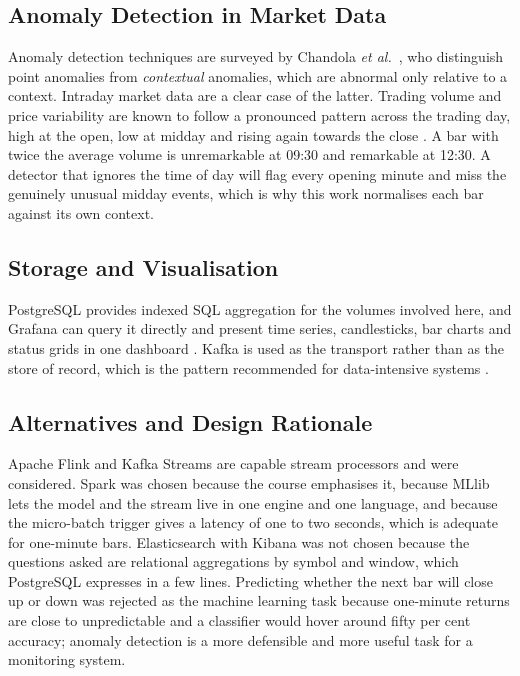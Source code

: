 \documentclass[conference]{IEEEtran}
\begin{document}
\subsection{Anomaly Detection in Market Data}
Anomaly detection techniques are surveyed by Chandola \emph{et al.}\ \cite{chandola2009}, who distinguish point anomalies from \emph{contextual} anomalies, which are abnormal only relative to a context. Intraday market data are a clear case of the latter. Trading volume and price variability are known to follow a pronounced pattern across the trading day, high at the open, low at midday and rising again towards the close \cite{admati1988}. A bar with twice the average volume is unremarkable at 09:30 and remarkable at 12:30. A detector that ignores the time of day will flag every opening minute and miss the genuinely unusual midday events, which is why this work normalises each bar against its own context.

\subsection{Storage and Visualisation}
PostgreSQL provides indexed SQL aggregation for the volumes involved here, and Grafana can query it directly and present time series, candlesticks, bar charts and status grids in one dashboard \cite{pgdocs,grafanadocs}. Kafka is used as the transport rather than as the store of record, which is the pattern recommended for data-intensive systems \cite{kleppmann2017}.

\subsection{Alternatives and Design Rationale}
Apache Flink \cite{carbone2015} and Kafka Streams are capable stream processors and were considered. Spark was chosen because the course emphasises it, because MLlib lets the model and the stream live in one engine and one language, and because the micro-batch trigger gives a latency of one to two seconds, which is adequate for one-minute bars. Elasticsearch with Kibana was not chosen because the questions asked are relational aggregations by symbol and window, which PostgreSQL expresses in a few lines. Predicting whether the next bar will close up or down was rejected as the machine learning task because one-minute returns are close to unpredictable and a classifier would hover around fifty per cent accuracy; anomaly detection is a more defensible and more useful task for a monitoring system.
\end{document}
